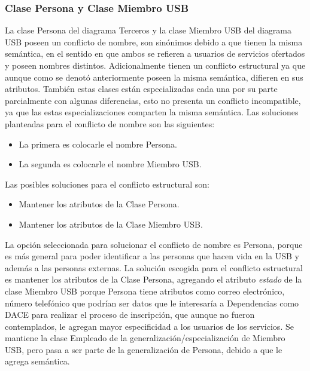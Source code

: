 \message{ !name(InformeFase2.tex)}\documentclass[12pt,a4paper,spanish]{article}
\begin{document}
\subsubsection{Clase Persona y Clase Miembro USB}
\newline
\indent La clase Persona del diagrama Terceros y la clase Miembro USB del diagrama USB poseen un conflicto de nombre, son sin\'onimos debido a que tienen la misma sem\'antica, en el sentido en que ambos se refieren a usuarios de servicios ofertados y poseen nombres distintos. Adicionalmente tienen un conflicto estructural ya que aunque como se denot\'o anteriormente poseen la misma sem\'antica, difieren en sus atributos. Tambi\'en estas clases est\'an especializadas cada una por su parte parcialmente con algunas diferencias, esto no presenta un conflicto incompatible, ya que las estas especializaciones comparten la misma sem\'antica.
\newline
\newline
\indent Las soluciones planteadas para el conflicto de nombre son las siguientes:
\begin{itemize}
\indent La posible soluci\'on de nombres es poner el mismo nombre en ambas clases. 
\item La primera es colocarle el nombre Persona.
\item La segunda es colocarle el nombre Miembro USB.
\end{itemize}
\newline
\indent Las posibles soluciones para el conflicto estructural son:
\begin{itemize}
\item Mantener los atributos de la Clase Persona.
\item Mantener los atributos de la Clase Miembro USB.
\end{itemize}
\newline
\newline
\indent La opci\'on seleccionada para solucionar el conflicto de nombre es Persona, porque es m\'as general para poder identificar a las personas que hacen vida en la USB y adem\'as a las personas externas.
\newline
\newline
\indent La soluci\'on escogida para el conflicto estructural es mantener los atributos de la Clase Persona, agregando el atributo \emph{estado} de la clase Miembro USB porque Persona tiene atributos como correo electr\'onico, n\'umero telef\'onico que podr\'ian ser datos que le interesar\'ia a Dependencias como DACE para realizar el proceso de inscripci\'on, que aunque no fueron contemplados, le agregan mayor especificidad a los usuarios de los servicios.
\newline
\newline
\indent Se mantiene la clase Empleado de la generalizaci\'on/especializaci\'on de Miembro USB, pero pasa a ser parte de la generalizaci\'on de Persona, debido a que le agrega sem\'antica.
\newline
\newline
\end{document}
